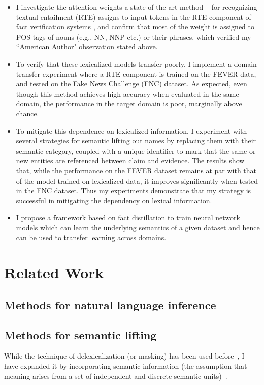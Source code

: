 \documentclass{article}
\begin{document}
\begin{itemize}

\item I investigate the attention weights a state of the art method  ~\cite{parikh2016decomposable}  for recognizing textual entailment (RTE) assigns to input tokens in the RTE component of fact verification systems \citep*{thorne2018fever,pomerleau2017fake}, and confirm that most of the weight is assigned to POS tags of nouns (e.g., NN, NNP etc.) or their phrases, which verified my ``American Author" observation stated above.

\item  To verify that these lexicalized models transfer poorly, I implement a domain transfer experiment where a RTE component is trained on the FEVER data, and tested on the Fake News Challenge (FNC) \citep{pomerleau2017fake} dataset. As expected, even though this method achieves high accuracy when evaluated in the same domain, the performance in the target domain is poor, marginally above chance.


\item  To mitigate this dependence on lexicalized information, I experiment with several strategies for semantic lifting out names by replacing them with their semantic category, coupled with a unique identifier to mark that the same or new entities are referenced between claim and evidence. The results show that, while the performance on the FEVER dataset remains at par with that of the model trained on lexicalized data, it improves significantly when tested in the FNC dataset. Thus my experiments demonstrate that my strategy is successful in mitigating the dependency on lexical information.


\item I propose a framework based on fact distillation to train neural network models which can learn the underlying semantics of a given dataset and hence can be used to transfer learning across domains.
\end{itemize}

\section{Related Work}
\subsection{Methods for natural language inference}
\subsection{Methods for semantic lifting}
While the technique of delexicalization (or masking) has been used before~\citep*{zeman2008cross}, I have expanded it by incorporating semantic information (the assumption that meaning arises from a set of independent and discrete semantic units)~\citep*{peyrard2019simple}. 
\end{document}
